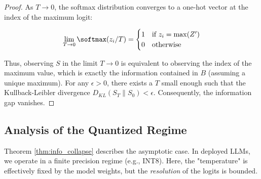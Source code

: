 \begin{proof}






As $T \to 0$, the softmax distribution converges to a one-hot vector at the index of the maximum logit:






$$






\lim_{T \to 0} \softmax(z_i / T) = \begin{cases} 






1 & \text{if } z_i = \max(Z') \\






0 & \text{otherwise}






\end{cases}






$$






Thus, observing $S$ in the limit $T \to 0$ is equivalent to observing the index of the maximum value, which is exactly the information contained in $B$ (assuming a unique maximum). For any $\epsilon > 0$, there exists a $T$ small enough such that the Kullback-Leibler divergence $D_{KL}(S_T \| S_0) < \epsilon$. Consequently, the information gap vanishes.






\end{proof}













\subsection{Analysis of the Quantized Regime}






Theorem \ref{thm:info_collapse} describes the asymptotic case. In deployed LLMs, we operate in a finite precision regime (e.g., INT8). Here, the "temperature" is effectively fixed by the model weights, but the \textit{resolution} of the logits is bounded.













